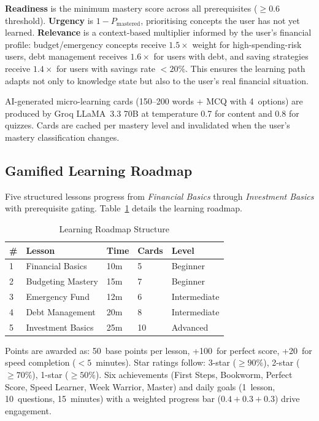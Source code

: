 \documentclass[conference]{IEEEtran}
\begin{document}
\textbf{Readiness} is the minimum mastery score across all prerequisites ($\geq 0.6$ threshold). \textbf{Urgency} is $1 - P_{\text{mastered}}$, prioritising concepts the user has not yet learned. \textbf{Relevance} is a context-based multiplier informed by the user's financial profile: budget/emergency concepts receive $1.5\times$ weight for high-spending-risk users, debt management receives $1.6\times$ for users with debt, and saving strategies receive $1.4\times$ for users with savings rate $< 20\%$. This ensures the learning path adapts not only to knowledge state but also to the user's real financial situation.

AI-generated micro-learning cards (150--200 words + MCQ with 4~options) are produced by Groq LLaMA~3.3 70B at temperature 0.7 for content and 0.8 for quizzes. Cards are cached per mastery level and invalidated when the user's mastery classification changes.

\subsection{Gamified Learning Roadmap}

Five structured lessons progress from \textit{Financial Basics} through \textit{Investment Basics} with prerequisite gating. Table~\ref{tab:lessons} details the learning roadmap.

\begin{table}[!t]
\centering
\caption{Learning Roadmap Structure}
\label{tab:lessons}
\renewcommand{\arraystretch}{1.15}
\footnotesize
\begin{tabular}{p{0.4cm} p{2.2cm} p{0.8cm} p{0.8cm} p{1.8cm}}
\toprule
\textbf{\#} & \textbf{Lesson} & \textbf{Time} & \textbf{Cards} & \textbf{Level} \\
\midrule
1 & Financial Basics  & 10m & 5  & Beginner \\
2 & Budgeting Mastery & 15m & 7  & Beginner \\
3 & Emergency Fund    & 12m & 6  & Intermediate \\
4 & Debt Management   & 20m & 8  & Intermediate \\
5 & Investment Basics & 25m & 10 & Advanced \\
\bottomrule
\end{tabular}
\end{table}

Points are awarded as: 50~base points per lesson, +100~for perfect score, +20~for speed completion ($<5$~minutes). Star ratings follow: 3-star ($\geq 90\%$), 2-star ($\geq 70\%$), 1-star ($\geq 50\%$). Six achievements (First Steps, Bookworm, Perfect Score, Speed Learner, Week Warrior, Master) and daily goals (1~lesson, 10~questions, 15~minutes) with a weighted progress bar ($0.4 + 0.3 + 0.3$) drive engagement.
\end{document}
